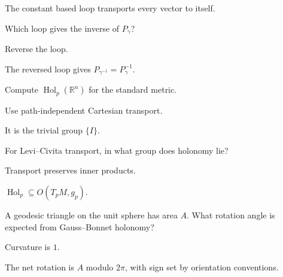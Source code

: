 \begin{solution}
The constant based loop transports every vector to itself.
\end{solution}

\begin{exercise}\label{exr:vii25-ped-02}
Which loop gives the inverse of \(P_\gamma\)?
\end{exercise}

\begin{hint}
Reverse the loop.
\end{hint}

\begin{solution}
The reversed loop gives \(P_{\gamma^{-1}}=P_\gamma^{-1}\).
\end{solution}

\begin{exercise}\label{exr:vii25-ped-03}
Compute \(\operatorname{Hol}_p(\mathbb R^n)\) for the standard metric.
\end{exercise}

\begin{hint}
Use path-independent Cartesian transport.
\end{hint}

\begin{solution}
It is the trivial group \(\{I\}\).
\end{solution}

\begin{exercise}\label{exr:vii25-ped-04}
For Levi--Civita transport, in what group does holonomy lie?
\end{exercise}

\begin{hint}
Transport preserves inner products.
\end{hint}

\begin{solution}
\(\operatorname{Hol}_p\subseteq O(T_pM,g_p)\).
\end{solution}

\begin{exercise}\label{exr:vii25-ped-05}
A geodesic triangle on the unit sphere has area \(A\).  What rotation angle is expected from Gauss--Bonnet holonomy?
\end{exercise}

\begin{hint}
Curvature is \(1\).
\end{hint}

\begin{solution}
The net rotation is \(A\) modulo \(2\pi\), with sign set by orientation conventions.
\end{solution}

